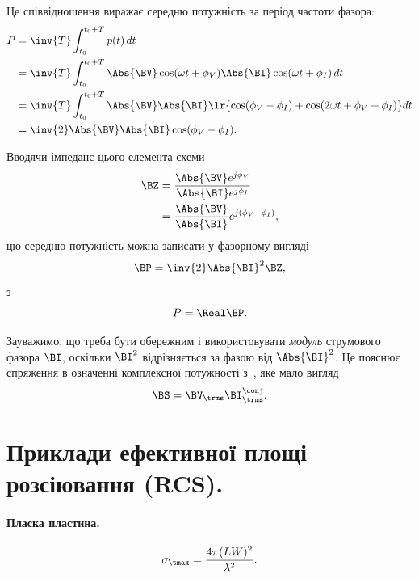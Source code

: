 Це співвідношення виражає середню потужність за період частоти фазора:
\begin{equation}\label{eqn:chapter2Notes:640}
\begin{aligned}
P
&= \inv{T} \int_{t_0}^{t_0 + T} p(t)\, dt
\\ &= \inv{T} \int_{t_0}^{t_0 + T} \Abs{\BV} \cos(\omega t + \phi_V) \Abs{\BI} \cos(\omega t + \phi_I)\, dt
\\ &= \inv{T} \int_{t_0}^{t_0 + T} \Abs{\BV} \Abs{\BI}
\lr{
   \cos(\phi_V - \phi_I) + \cos(2 \omega t + \phi_V + \phi_I)
}
dt
\\ &= \inv{2} \Abs{\BV} \Abs{\BI} \cos(\phi_V - \phi_I).
\end{aligned}
\end{equation}

Вводячи імпеданс цього елемента схеми
\begin{equation}\label{eqn:chapter2Notes:660}
\begin{aligned}
\BZ &= \frac{\Abs{\BV} e^{j\phi_V}}{\Abs{\BI} e^{j\phi_I}} \\ &= \frac{\Abs{\BV}}{\Abs{\BI}} e^{j(\phi_V - \phi_I)},
\end{aligned}
\end{equation}
цю середню потужність можна записати у фазорному вигляді
\begin{equation}\label{eqn:chapter2Notes:680}
\BP = \inv{2} \Abs{\BI}^2 \BZ,
\end{equation}
з
\begin{equation}\label{eqn:chapter2Notes:700}
P = \Real \BP.
\end{equation}

Зауважимо, що треба бути обережним і використовувати \emph{модуль} струмового фазора \(\BI\), оскільки \(\BI^2\) відрізняється за фазою від \(\Abs{\BI}^2\). Це пояснює спряження в означенні комплексної потужності з~\citep{irwin2007bec}, яке мало вигляд
\begin{equation}\label{eqn:chapter2Notes:720}
\BS = \BV_\trms \BI^\conj_\trms.
\end{equation}

\section{Приклади ефективної площі розсіювання (RCS).}

\paragraph{Пласка пластина.}
\begin{equation}\label{eqn:chapter2Notes:960}
\sigma_\tmax = \frac{4 \pi (L W)^2}{\lambda^2}.
\end{equation}

